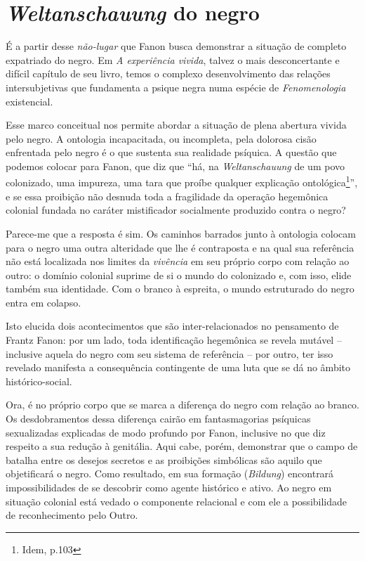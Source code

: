 \chapter{\emph{Weltanschauung} do negro}

É a partir desse \emph{não-lugar} que Fanon busca demonstrar a situação
de completo expatriado do negro. Em \emph{A experiência vivida}, talvez
o mais desconcertante e difícil capítulo de seu livro, temos o complexo
desenvolvimento das relações intersubjetivas que fundamenta a psique
negra numa espécie de \emph{Fenomenologia} existencial.

Esse marco conceitual nos permite abordar a situação de plena abertura
vivida pelo negro. A ontologia incapacitada, ou incompleta, pela
dolorosa cisão enfrentada pelo negro é o que sustenta sua realidade
psíquica. A questão que podemos colocar para Fanon, que diz que ``há, na
\emph{Weltanschauung} de um povo colonizado, uma impureza, uma tara que
proíbe qualquer explicação ontológica\footnote{Idem, p.103}'', e se essa
proibição não desnuda toda a fragilidade da operação hegemônica colonial
fundada no caráter mistificador socialmente produzido contra o negro?

Parece-me que a resposta é sim. Os caminhos barrados junto à ontologia
colocam para o negro uma outra alteridade que lhe é contraposta e na
qual sua referência não está localizada nos limites da \emph{vivência}
em seu próprio corpo com relação ao outro: o domínio colonial suprime de
si o mundo do colonizado e, com isso, elide também sua identidade. Com o
branco à espreita, o mundo estruturado do negro entra em colapso.

Isto elucida dois acontecimentos que são inter-relacionados no
pensamento de Frantz Fanon: por um lado, toda identificação hegemônica
se revela mutável -- inclusive aquela do negro com seu sistema de
referência -- por outro, ter isso revelado manifesta a consequência
contingente de uma luta que se dá no âmbito histórico-social.

Ora, é no próprio corpo que se marca a diferença do negro com relação ao
branco. Os desdobramentos dessa diferença cairão em fantasmagorias
psíquicas sexualizadas explicadas de modo profundo por Fanon, inclusive
no que diz respeito a sua redução à genitália. Aqui cabe, porém,
demonstrar que o campo de batalha entre os desejos secretos e as
proibições simbólicas são aquilo que objetificará o negro. Como
resultado, em sua formação (\emph{Bildung}) encontrará impossibilidades
de se descobrir como agente histórico e ativo. Ao negro em situação
colonial está vedado o componente relacional e com ele a possibilidade
de reconhecimento pelo Outro.

